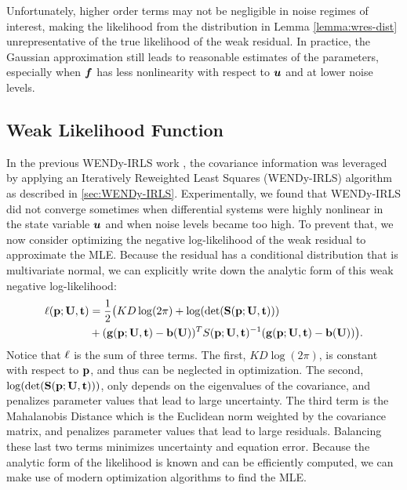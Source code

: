 \begin{remark}
    Unfortunately, higher order terms may not be negligible in noise regimes of interest, making the likelihood from the distribution in Lemma \ref{lemma:wres-dist}  unrepresentative of the true likelihood of the weak residual. In practice, the Gaussian approximation still leads to reasonable estimates of the parameters, especially when $\boldsymbol{f}$ has less nonlinearity with respect to $\boldsymbol{u}$ and at lower noise levels. 
\end{remark}

\subsection{Weak Likelihood Function}
In the previous WENDy-IRLS work \citep{BortzMessengerDukic2023BullMathBiol}, the covariance information was leveraged by applying an Iteratively Reweighted Least Squares (WENDy-IRLS) algorithm as described in \ref{sec:WENDy-IRLS}. Experimentally, we found that WENDy-IRLS did not converge sometimes when differential systems were highly nonlinear in the state variable $\boldsymbol{u}$ and when noise levels became too high. To prevent that, we now consider optimizing the negative log-likelihood of the weak residual to approximate the MLE. Because the residual has a conditional distribution that is multivariate normal, we can explicitly write down the analytic form of this weak negative log-likelihood:
\begin{equation}\label{eq:wnll}
	\begin{split}
	\ell(\mathbf{p}; \mathbf{U}, \mathbf{t}) &= \frac{1}{2} \bigl( KD \log(2 \pi) + \log(\det(\mathbf{S}(\mathbf{p};\mathbf{U},\mathbf{t}))) \\
	&+ (\mathbf{g}(\mathbf{p};\mathbf{U},\mathbf{t})-\mathbf{b}(\mathbf{U}))^TS(\mathbf{p};\mathbf{U},\mathbf{t})^{-1}(\mathbf{g}(\mathbf{p};\mathbf{U},\mathbf{t})-\mathbf{b}(\mathbf{U})) \bigr).
	\end{split}
\end{equation}
Notice that $\ell$ is the sum of three terms. The first, $KD \log(2 \pi)$, is constant with respect to $\mathbf{p}$, and thus can be neglected in optimization. The second, $\log(\det(\mathbf{S}(\mathbf{p};\mathbf{U},\mathbf{t})))$, only depends on the eigenvalues of the covariance, and penalizes parameter values that lead to large uncertainty. The third term is the Mahalanobis Distance which is the Euclidean norm weighted by the covariance matrix, and penalizes parameter values that lead to large residuals. Balancing these last two terms minimizes uncertainty and equation error. Because the analytic form of the likelihood is known and can be efficiently computed, we can make use of modern optimization algorithms to find the MLE.

